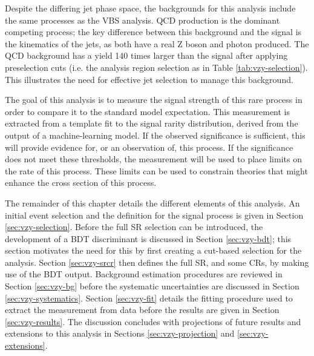 Despite the differing jet phase space, the backgrounds for this analysis include
the same processes as the \ac{VBS} \Zy analysis. \ac{QCD} \Zyjj production is the dominant
competing process; the key difference between this background and the signal
is the kinematics of the jets, as both have a real Z boson and photon produced.
%
The QCD \Zy background has a yield 140 times larger than the signal after
applying preselection cuts (i.e. the analysis region selection as in Table
\ref{tab:vzy-selection}).  This illustrates the need for effective jet selection
to manage this background.

The goal of this analysis is to measure the signal strength of this rare
process in order to compare it to the standard model expectation.  This
measurement is extracted from a template fit to the signal rarity
distribution, derived from the output of a machine-learning model. If the
observed significance is sufficient, this will provide evidence for, or an
observation of, this process. If the significance does not meet these
thresholds, the measurement will be used to place limits on the rate of this
process. These limits can be used to constrain theories that might enhance the
cross section of this process.

The remainder of this chapter details the different elements of this analysis.
An initial event selection and the definition for the signal process is given in
Section \ref{sec:vzy-selection}. Before the full \ac{SR} selection can be
introduced, the development of a \ac{BDT} discriminant is discussed in Section
\ref{sec:vzy-bdt}; this section motivates the need for this by first creating a
cut-based selection for the analysis. Section \ref{sec:vzy-srcr} then defines
the full \ac{SR}, and some \acp{CR}, by making use of the \ac{BDT} output.
Background estimation procedures are reviewed in Section \ref{sec:vzy-bg} before
the systematic uncertainties are discussed in Section \ref{sec:vzy-systematics}.
Section \ref{sec:vzy-fit} details the fitting procedure used to extract the
measurement from data before the results are given in Section
\ref{sec:vzy-results}. The discussion concludes with projections of future
results and extensions to this analysis in Sections \ref{sec:vzy-projection} and
\ref{sec:vzy-extensions}.


